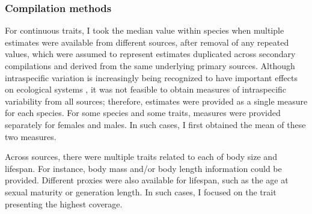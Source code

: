 \subsubsection{Compilation methods}
For continuous traits, I took the median value within species when multiple estimates were available from different sources, after removal of any repeated values, which were assumed to represent estimates duplicated across secondary compilations and derived from the same underlying primary sources. Although intraspecific variation is increasingly being recognized to have important effects on ecological systems \citep{Bolnick2011, Siefert2015, DesRoches2018, GonzalezSuarez2012a}, it was not feasible to obtain measures of intraspecific variability from all sources; therefore, estimates were provided as a single measure for each species. For some species and some traits, measures were provided separately for females and males. In such cases, I first obtained the mean of these two measures.

Across sources, there were multiple traits related to each of body size and lifespan. For instance, body mass and/or body length information could be provided. Different proxies were also available for lifespan, such as the age at sexual maturity or generation length. In such cases, I focused on the trait presenting the highest coverage.


